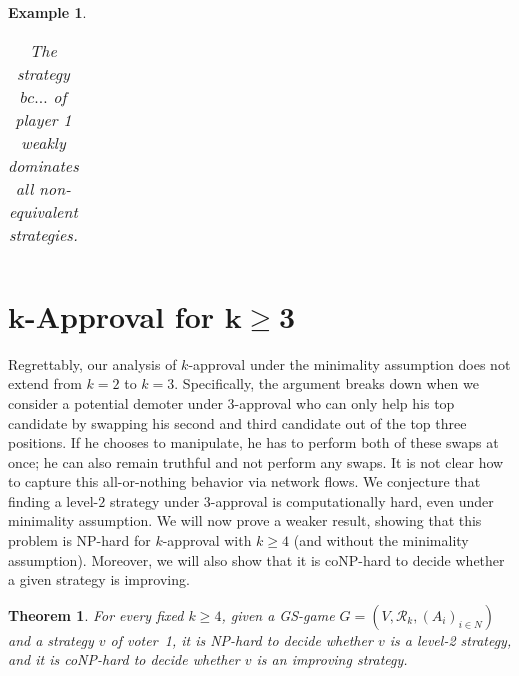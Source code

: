 \documentclass[11pt]{article}
\newtheorem{theorem}{Theorem}%
\newtheorem{example}{Example}
\newcommand{\calR}{\mathcal{R}}
\begin{document}
\begin{example}
{\begin{table}[h]
\begin{center}
\begin{tabular}{c|c|c|c|c|c|c}
\end{tabular}
\caption{The strategy $bc\dots$ of player 1 weakly dominates all non-equivalent strategies.
}\label{table:non-min}
\end{center}
\end{table}
}
\end{example}

\section{$\boldsymbol{k}$-Approval for $\boldsymbol{k\ge 3}$}\label{sec:hard}
Regrettably, our analysis of $k$-approval under the minimality assumption does not extend 
from $k=2$ to $k=3$. Specifically, the argument breaks down when we consider a potential demoter
under 3-approval who can only help his top candidate by swapping his second and third candidate 
out of the top three positions. If he chooses to manipulate, he has to perform both 
of these swaps at once; he can also remain truthful and not perform any swaps. 
It is not clear how to capture this all-or-nothing behavior via network flows.
We conjecture that finding a level-$2$ strategy under $3$-approval is computationally hard,  
even under minimality assumption. We will now prove a weaker result, showing that
this problem is NP-hard for $k$-approval with $k\ge 4$ (and without the minimality assumption).
Moreover, we will also show that it is coNP-hard to decide whether a given strategy is improving.

\begin{theorem}\label{thm:4app}
For every fixed $k\ge 4$, 
given a GS-game $G=(V, \calR_k, (A_i)_{i\in N})$ and a strategy $v$
of voter~1, it is {\em NP}-hard to decide whether $v$ is a level-2 strategy, 
and it is {\em coNP}-hard to decide whether $v$ is an improving strategy. 
\end{theorem}
\end{document}
